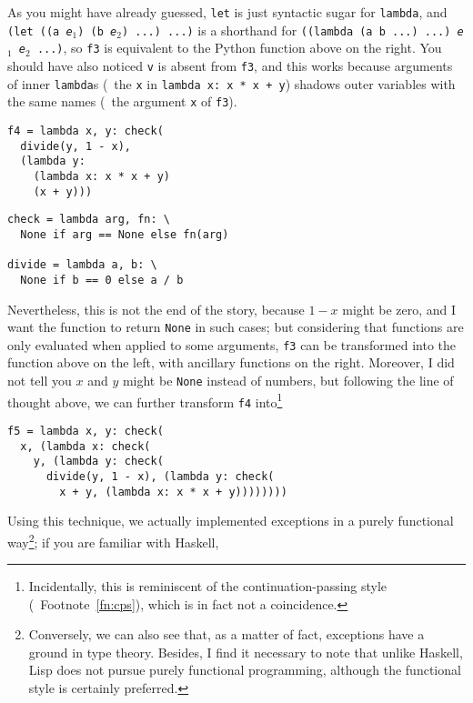 As you might have already guessed, \verb|let| is just syntactic sugar for
\verb|lambda|, and \texttt{(let ((a \emph{e$_1$}) (b \emph{e$_2$}) ...) ...)}
is a shorthand for \texttt{((lambda (a b ...) ...) \emph{e$_1$} \emph{e$_2$}
...)}, so \verb|f3| is equivalent to the Python function above on the right.
You should have also noticed \verb|v| is absent from \verb|f3|, and this
works because arguments of inner \verb|lambda|s (\eg~the \verb|x|
in \texttt{lambda x: x * x + y}) shadows outer variables with
the same names (\eg~the argument \verb|x| of \verb|f3|).

\colskipa\begin{multicols}{2}
\begin{wquoting}
\begin{Verbatim}
f4 = lambda x, y: check(
  divide(y, 1 - x),
  (lambda y:
    (lambda x: x * x + y)
    (x + y)))
\end{Verbatim}
\end{wquoting}
\begin{wquoting}
\begin{Verbatim}
check = lambda arg, fn: \
  None if arg == None else fn(arg)

divide = lambda a, b: \
  None if b == 0 else a / b
\end{Verbatim}
\end{wquoting}
\end{multicols}\colskipb
Nevertheless, this is not the end of the story, because $1 - x$ might
be zero, and I want the function to return \verb|None| in such cases;
but considering that functions are only evaluated when applied to some
arguments, \verb|f3| can be transformed into the function above on the left,
with ancillary functions on the right.  Moreover, I did not tell you $x$ and
$y$ might be \verb|None| instead of numbers, but following the line of thought
above, we can further transform \verb|f4| into\footnote{Incidentally, this is
reminiscent of the continuation-passing style (\cf~Footnote~\ref{fn:cps}),
which is in fact not a coincidence\cupercite{troelskn2009}.}
\begin{wquoting}
\begin{Verbatim}
f5 = lambda x, y: check(
  x, (lambda x: check(
    y, (lambda y: check(
      divide(y, 1 - x), (lambda y: check(
        x + y, (lambda x: x * x + y))))))))
\end{Verbatim}
\end{wquoting}
Using this technique, we actually implemented exceptions in a purely functional
way\footnote{Conversely, we can also see that, as a matter of fact, exceptions
have a ground in type theory.  Besides, I find it necessary to note that
unlike Haskell, Lisp does not pursue purely functional programming, although
the functional style is certainly preferred.}; if you are familiar with Haskell,
